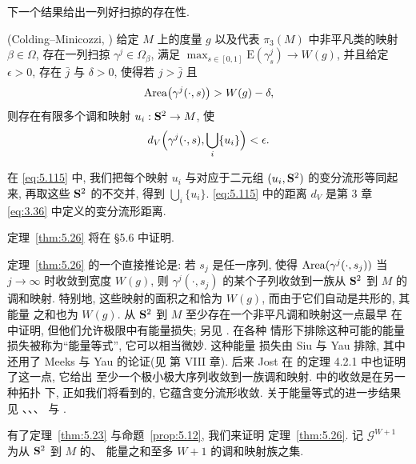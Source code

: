 下一个结果给出一列好扫掠的存在性.

\begin{theorem}
\label{thm:5.26}
(Colding--Minicozzi, \cite{CM27}) 给定 $M$ 上的度量 $g$ 以及代表
$\pi_3(M)$ 中非平凡类的映射 $\beta\in\Omega$, 存在一列扫掠
$\gamma^j\in\Omega_\beta$, 满足
$\max_{s\in[0,1]}\mathrm{E}(\gamma_s^j)\to W(g)$, 并且给定
$\epsilon>0$, 存在 $\bar{j}$ 与 $\delta>0$, 使得若 $j>\bar{j}$ 且
\begin{equation}
\operatorname{Area}\bigl(\gamma^j(\cdot,s)\bigr)>W(g)-\delta,
\label{eq:5.114}
\end{equation}
则存在有限多个调和映射 $u_i:\mathbf{S}^2\to M$, 使
\begin{equation}
d_V\Bigl(\gamma^j(\cdot,s),\bigcup_i\{u_i\}\Bigr)<\epsilon.
\label{eq:5.115}
\end{equation}
\end{theorem}

在 \eqref{eq:5.115} 中, 我们把每个映射 $u_i$ 与对应于二元组
$(u_i,\mathbf{S}^2)$ 的变分流形等同起来, 再取这些 $\mathbf{S}^2$ 的不交并, 得到
$\bigcup_i\{u_i\}$. \eqref{eq:5.115} 中的距离 $d_V$ 是第 3 章
\eqref{eq:3.36} 中定义的变分流形距离.

定理~\ref{thm:5.26} 将在 \S 5.6 中证明.

定理~\ref{thm:5.26} 的一个直接推论是: 若 $s_j$ 是任一序列, 使得
$\operatorname{Area}(\gamma^j(\cdot,s_j))$ 当 $j\to\infty$ 时收敛到宽度 $W(g)$, 则
$\gamma^j(\cdot,s_j)$ 的某个子列收敛到一族从 $\mathbf{S}^2$ 到 $M$ 的调和映射.
特别地, 这些映射的面积之和恰为 $W(g)$, 而由于它们自动是共形的, 其能量
之和也为 $W(g)$. 从 $\mathbf{S}^2$ 到 $M$ 至少存在一个非平凡调和映射这一点最早
在 \cite{SaUh} 中证明, 但他们允许极限中有能量损失; 另见 \cite{St}. 在各种
情形下排除这种可能的能量损失被称为``能量等式'', 它可以相当微妙. 这种能量
损失由 Siu 与 Yau 排除, 其中还用了 Meeks 与 Yau 的论证(见 \cite{ScYa2}
第 VIII 章). 后来 Jost 在 \cite{Jo} 的定理 4.2.1 中也证明了这一点, 它给出
至少一个极小极大序列收敛到一族调和映射. \cite{Jo} 中的收敛是在另一种拓扑
下, 正如我们将看到的, 它蕴含变分流形收敛. 关于能量等式的进一步结果见
\cite{Pk}、\cite{DiTi}、\cite{Lt}、\cite{LfWc1} 与 \cite{LfWc2}.

有了定理~\ref{thm:5.23} 与命题~\ref{prop:5.12}, 我们来证明
定理~\ref{thm:5.26}. 记 $\mathcal{G}^{W+1}$ 为从 $\mathbf{S}^2$ 到 $M$ 的、
能量之和至多 $W+1$ 的调和映射族之集.


